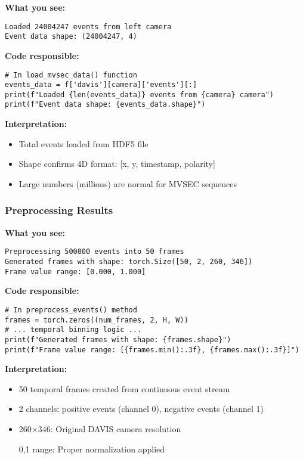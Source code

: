 \documentclass[12pt,a4paper]{article}
\begin{document}
\textbf{What you see:}
\begin{lstlisting}
Loaded 24004247 events from left camera
Event data shape: (24004247, 4)
\end{lstlisting}

\textbf{Code responsible:}
\begin{lstlisting}
# In load_mvsec_data() function
events_data = f['davis'][camera]['events'][:]
print(f"Loaded {len(events_data)} events from {camera} camera")
print(f"Event data shape: {events_data.shape}")
\end{lstlisting}

\textbf{Interpretation:}
\begin{itemize}
    \item Total events loaded from HDF5 file
    \item Shape confirms 4D format: [x, y, timestamp, polarity]
    \item Large numbers (millions) are normal for MVSEC sequences
\end{itemize}

\subsubsection{Preprocessing Results}

\textbf{What you see:}
\begin{lstlisting}
Preprocessing 500000 events into 50 frames
Generated frames with shape: torch.Size([50, 2, 260, 346])
Frame value range: [0.000, 1.000]
\end{lstlisting}

\textbf{Code responsible:}
\begin{lstlisting}
# In preprocess_events() method
frames = torch.zeros((num_frames, 2, H, W))
# ... temporal binning logic ...
print(f"Generated frames with shape: {frames.shape}")
print(f"Frame value range: [{frames.min():.3f}, {frames.max():.3f}]")
\end{lstlisting}

\textbf{Interpretation:}
\begin{itemize}
    \item 50 temporal frames created from continuous event stream
    \item 2 channels: positive events (channel 0), negative events (channel 1)
    \item 260×346: Original DAVIS camera resolution
    \item [0,1] range: Proper normalization applied
\end{itemize}
\end{document}
